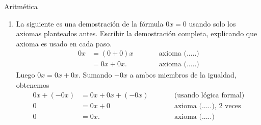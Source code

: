 \begin{section}{Aritmética}
\begin{enumerate}
\item \label{ej0a}
La siguiente es una demostración de la fórmula $0x=0$ usando solo los axiomas planteados antes. Escribir la demostración completa, explicando que axioma es usado en cada paso.
$$\begin{aligned}
0x &= (0+0)x &\qquad &\mbox{axioma (.....)}\\  
&=0x+0x. &\qquad &\mbox{axioma (.....)}
\end{aligned}$$
Luego $0x =0x+0x$. Sumando $-0x$ a ambos miembros de la igualdad, obtenemos 
$$\begin{aligned}
0x +(-0x) &= 0x+0x+(-0x) &\qquad &\mbox{(usando lógica formal)}\\  
0 &= 0x+0 &\qquad &\mbox{axioma (.....), 2 veces}\\  
0 &=0x. &\qquad &\mbox{axioma (.....)}
\end{aligned}$$
\end{enumerate}

\end{section}



